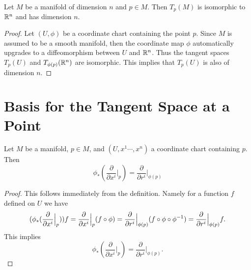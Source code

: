 \begin{corollary}
	\label{cor:TangentSpaceIsoMorphismToRn}
	Let $ M $ be a manifold of dimension $ n $ and $ p \in M $. Then $ T_p(M) $ is isomorphic to $ \mathbb{R}^n $ and has dimension $ n $.
\end{corollary}
\begin{proof}
	Let $ (U,\phi) $ be a coordinate chart containing the point $ p $. Since $ M $ is assumed to be a smooth manifold, then the coordinate map $ \phi $ automatically upgrades to a diffeomorphism between $ U $ and $ \mathbb{R}^n $. Thus the tangent spaces $ T_p(U) $ and $ T_{\phi(p)}(\mathbb{R}^n) $ are isomorphic. This implies that $ T_p(U) $ is also of dimension $ n $.
\end{proof}

\section{Basis for the Tangent Space at a Point}
\begin{proposition}
	\label{prop:DifferentialOfACoordinateMap}
	Let $ M $ be a manifold, $ p \in M $, and $ (U,x^1\cdots,x^n) $ a coordinate chart containing $ p $. Then
	\[ \phi_* (\frac{\partial}{\partial  x^i}\big|_{p}) = \frac{\partial}{\partial  r^i}\big|_{\phi(p)} \]
\end{proposition}
\begin{proof}
	This follows immediately from the definition. Namely for a function $ f $ defined on $ U $ we have
	\begin{align*}
		(\phi_*(\frac{\partial}{\partial  x^i}\big|_{p}))f = \frac{\partial}{\partial  x^i}\big|_{p}(f\circ \phi) = \frac{\partial}{\partial  r^i}\big|_{\phi(p)}(f\circ\phi\circ\phi^{-1}) = \frac{\partial}{\partial  r^i}\big|_{\phi(p)}f.
	\end{align*}
	This implies 
	\[ \phi_*(\frac{\partial}{\partial  x^i}\big|_{p}) = \frac{\partial}{\partial  r^i}\big|_{\phi(p)}. \]
\end{proof}
